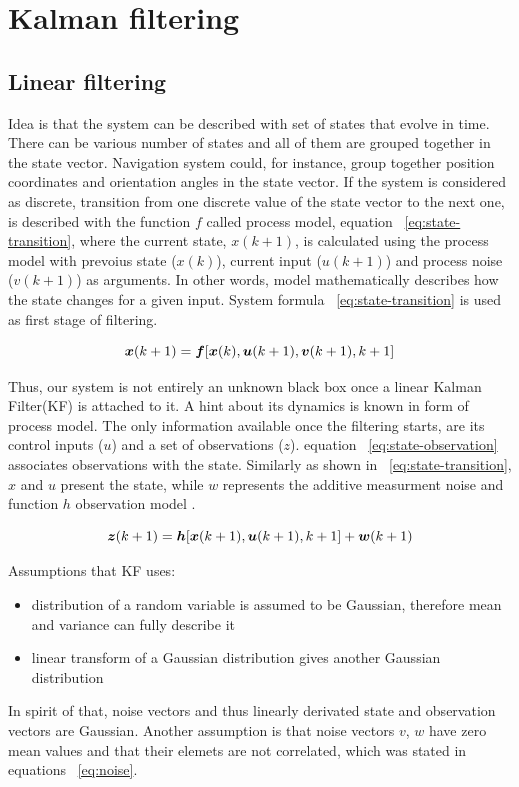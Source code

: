 \chapter{Kalman filtering} \label{chap:kalman}

\section{Linear filtering}
Idea is that the system can be described with set of states that evolve in time. There can be various number of states and all of them are grouped together in the state vector. Navigation system could, for instance, group together position coordinates and orientation angles in the state vector. If the system is considered as discrete, transition from one discrete value of the state vector to the next one, is described with the function $f$ called process model, equation ~\ref{eq:state-transition}, where the current state, $x(k+1)$, is calculated using the process model with prevoius state ($x(k)$), current input ($u(k+1)$) and process noise ($v(k+1)$) as arguments. In other words, model mathematically describes how the state changes for a given input. System formula ~\ref{eq:state-transition} is used as first stage of filtering.

\begin{equation}
\boldsymbol{x}(k+1) = \boldsymbol{f}[\boldsymbol{x}(k), \boldsymbol{u}(k+1), \boldsymbol{v}(k+1), k+1]
\label{eq:state-transition}
\end{equation}

Thus, our system is not entirely an unknown black box once a linear Kalman Filter(KF) is attached to it. A hint about its dynamics is known in form of process model. The only information available once the filtering starts, are its control inputs ($u$) and a set of observations ($z$). equation ~\ref{eq:state-observation} associates observations with the state. Similarly as shown in ~\ref{eq:state-transition}, $x$ and $u$ present the state, while $w$ represents the additive measurment noise and function $h$ observation model \cite{julier96}.
 
\begin{equation}
\boldsymbol{z}(k+1) = \boldsymbol{h}[\boldsymbol{x}(k+1), \boldsymbol{u}(k+1), k+1] + \boldsymbol{w}(k+1)
\label{eq:state-observation}
\end{equation} 
 
Assumptions that KF uses:
\begin{itemize}
\item distribution of a random variable is assumed to be Gaussian, therefore mean and variance can fully describe it
\item linear transform of a Gaussian distribution gives another Gaussian distribution 
\end{itemize}
In spirit of that, noise vectors and thus linearly derivated state and observation vectors are Gaussian. Another assumption is that noise vectors $v$, $w$ have zero mean values and that their elemets are not correlated, which was stated in equations ~\ref{eq:noise}.

